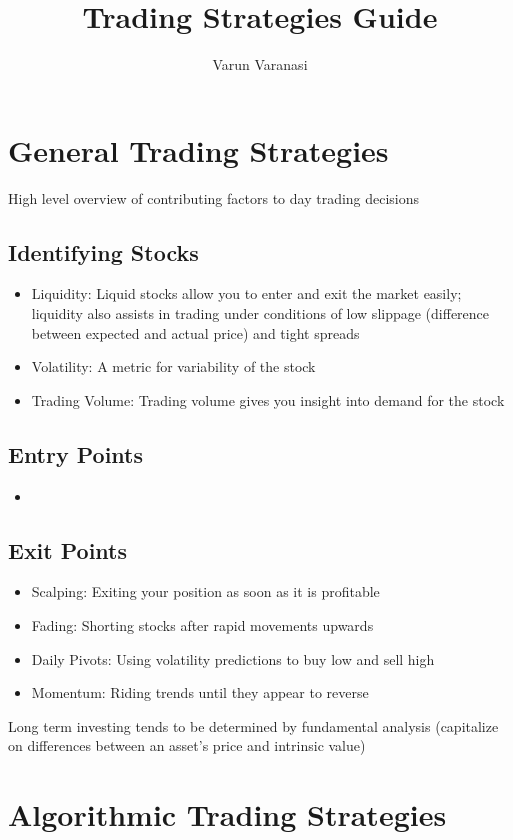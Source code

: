 \documentclass{article}
\title{Trading Strategies Guide}
\author{Varun Varanasi}
\begin{document}
\maketitle

\section{General Trading Strategies}
High level overview of contributing factors to day trading decisions

\subsection{Identifying Stocks}
\begin{itemize}
    \item Liquidity: Liquid stocks allow you to enter and exit the market easily; liquidity also assists in trading under conditions of low slippage (difference between expected and actual price) and tight spreads
    \item Volatility: A metric for variability of the stock
    \item Trading Volume: Trading volume gives you insight into demand for the stock
\end{itemize}

\subsection{Entry Points}
\begin{itemize}
    \item 
\end{itemize}

\subsection{Exit Points}
\begin{itemize}
    \item Scalping: Exiting your position as soon as it is profitable
    \item Fading: Shorting stocks after rapid movements upwards
    \item Daily Pivots: Using volatility predictions to buy low and sell high
    \item Momentum: Riding trends until they appear to reverse
\end{itemize}

Long term investing tends to be determined by fundamental analysis (capitalize on differences between an asset's price and intrinsic value)

\section{Algorithmic Trading Strategies}
\end{document}
